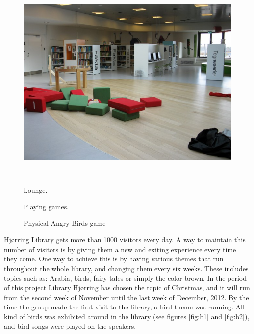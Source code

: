 \begin{figure}[htbp]
\begin{minipage}[b]{0.3\textwidth}
		\includegraphics[width=1.00\textwidth]{Pictures/HjoerringLibrary/p3.jpg} %
	\end{minipage}\\ %
	\begin{minipage}[t]{0.3\textwidth}
		\caption{Lounge.} %
		\label{fig:p1}
	\end{minipage}\hfill
	\begin{minipage}[t]{0.3\textwidth}
		\caption{Playing games.} %
		\label{fig:p2}
	\end{minipage}\hfill	
	\begin{minipage}[t]{0.3\textwidth}
		\caption{Physical Angry Birds game} %
		\label{fig:p3}
	\end{minipage}
\end{figure}

Hj{\o}rring Library gets more than 1000 visitors every day. A way to maintain this number of visitors is by giving them a new and exiting experience every time they come. One way to achieve this is by having various themes that run throughout the whole library, and changing them every six weeks. These includes topics such as: Arabia, birds, fairy tales or simply the color brown. In the period of this project Library Hj{\o}rring has chosen the topic of Christmas, and it will run from the second week of November until the last week of December, 2012. By the time the group made the first visit to the library, a bird-theme was running. All kind of birds was exhibited around in the library (see figures \ref{fig:b1} and \ref{fig:b2}), and bird songs were played on the speakers.

